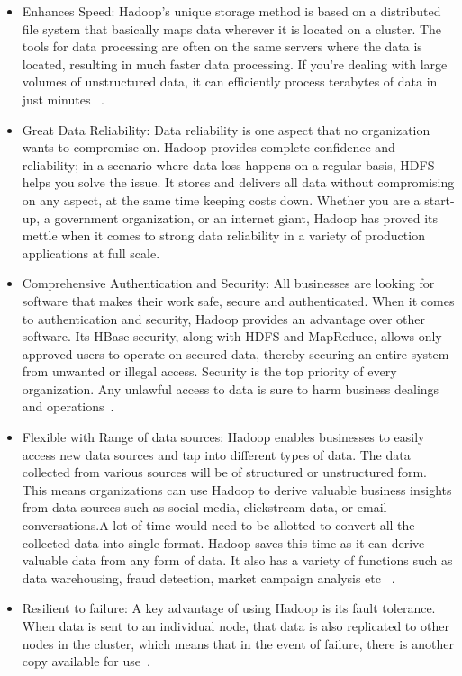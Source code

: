 \begin{itemize}
\item Enhances Speed: 
Hadoop's unique storage method is based on a distributed file system that 
basically maps data wherever it is located on a cluster. The tools for data 
processing are often on the same servers where the data is located, resulting 
in much faster data processing. If you’re dealing with large volumes of 
unstructured data, it can efficiently process terabytes of data in just minutes
~\cite{hid-sp18-406-hadoop-intro10}.

\item Great Data Reliability: 
Data reliability is one aspect that no organization wants to compromise on. 
Hadoop provides complete confidence and reliability; in a scenario where data 
loss happens on a regular basis, HDFS helps you solve the issue. It stores and 
delivers all data without compromising on any aspect, at the same time keeping 
costs down. Whether you are a start-up, a government organization, or an 
internet giant, Hadoop has proved its mettle when it comes to strong data 
reliability in a variety of production applications at full scale.

\item Comprehensive Authentication and Security: 
All businesses are looking for software that makes their work safe, secure and 
authenticated. When it comes to authentication and security, Hadoop provides an 
advantage over other software. Its HBase security, along with HDFS and 
MapReduce, allows only approved users to operate on secured data, thereby 
securing an entire system from unwanted or illegal access. Security is the top 
priority of every organization. Any unlawful access to data is sure to harm 
business dealings and operations~\cite{hid-sp18-406-hadoop-intro11}.

\item Flexible with Range of data sources: 
Hadoop enables businesses to easily access new data sources and tap into 
different types of data. The data collected from various sources will be of 
structured or unstructured form. This means organizations can use Hadoop to 
derive valuable business insights from data sources such as social media, 
clickstream data,  or email conversations.A lot of time would need to be 
allotted to convert all the collected data into single format. Hadoop saves 
this time as it can derive valuable data from any form of data. It also has a 
variety of functions such as data warehousing, fraud detection, market campaign 
analysis etc ~\cite{hid-sp18-406-hadoop-intro12}.

\item Resilient to failure: 
A key advantage of using Hadoop is its fault tolerance. When data is sent to an 
individual node, that data is also replicated to other nodes in the cluster, 
which means that in the event of failure, there is another copy available for 
use~\cite{hid-sp18-406-hadoop-intro13}.

\end{itemize}

